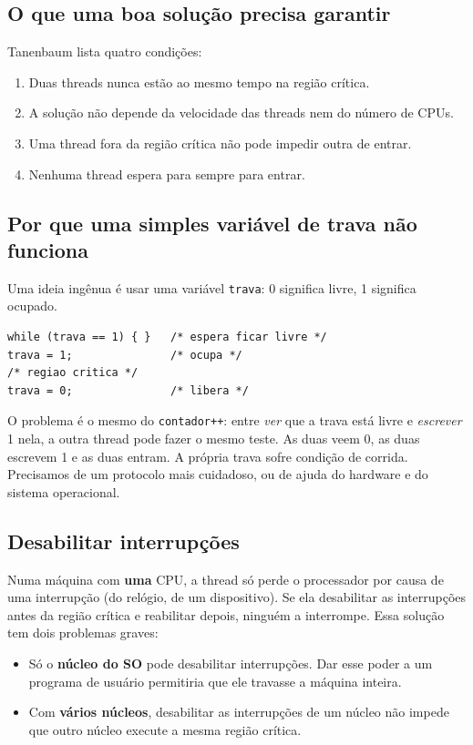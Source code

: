 \documentclass[11pt,a4paper]{article}
\newcommand{\cmd}[1]{\texttt{#1}}
\begin{document}
\subsection{O que uma boa solução precisa garantir}\label{sec:condicoes}

Tanenbaum lista quatro condições:

\begin{enumerate}
    \item Duas threads nunca estão ao mesmo tempo na região crítica.
    \item A solução não depende da velocidade das threads nem do número de CPUs.
    \item Uma thread fora da região crítica não pode impedir outra de entrar.
    \item Nenhuma thread espera para sempre para entrar.
\end{enumerate}

\subsection{Por que uma simples variável de trava não funciona}

Uma ideia ingênua é usar uma variável \cmd{trava}: 0 significa livre, 1 significa ocupado.

\begin{lstlisting}[style=codigo]
while (trava == 1) { }   /* espera ficar livre */
trava = 1;               /* ocupa */
/* regiao critica */
trava = 0;               /* libera */
\end{lstlisting}

O problema é o mesmo do \cmd{contador++}: entre \emph{ver} que a trava está livre e \emph{escrever} 1 nela, a outra thread pode fazer o mesmo teste. As duas veem 0, as duas escrevem 1 e as duas entram. A própria trava sofre condição de corrida. Precisamos de um protocolo mais cuidadoso, ou de ajuda do hardware e do sistema operacional.

\subsection{Desabilitar interrupções}

Numa máquina com \textbf{uma} CPU, a thread só perde o processador por causa de uma interrupção (do relógio, de um dispositivo). Se ela desabilitar as interrupções antes da região crítica e reabilitar depois, ninguém a interrompe. Essa solução tem dois problemas graves:

\begin{itemize}
    \item Só o \textbf{núcleo do SO} pode desabilitar interrupções. Dar esse poder a um programa de usuário permitiria que ele travasse a máquina inteira.
    \item Com \textbf{vários núcleos}, desabilitar as interrupções de um núcleo não impede que outro núcleo execute a mesma região crítica.
\end{itemize}
\end{document}
